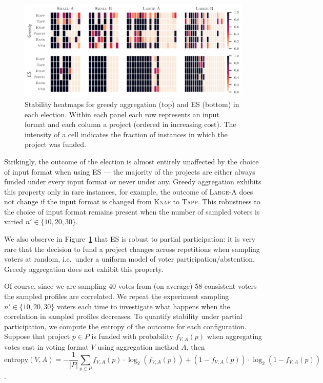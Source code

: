 \documentclass{comsoc2023}
\newcommand{\knap}{\textsc{Knap}}
\newcommand{\tapp}{\textsc{Tapp}}
\newcommand{\mes}{ES}
\begin{document}
\begin{figure}[h]
\begin{center}
\includegraphics[width=14cm]{experiment/heatmaps.png}
\caption{Stability heatmaps for  greedy aggregation (top) and \mes{} (bottom) in each election. 
Within each panel each row represents an   input format and each column a project (ordered in increasing cost).
 The intensity of a cell indicates the fraction of instances in which the project was funded.
}\label{fig:heatmap}
\end{center}\vspace{-3mm}
\end{figure}

Strikingly, the outcome of the election is almost entirely unaffected by the choice of input format when using \mes{} --- the majority of the projects are either always funded under every input format or never under any. Greedy aggregation exhibits this property only in rare instances, for example, the outcome of \textsc{Large-A} does not change if the input format is changed from \knap{} to \tapp.  This robustness to the choice of input format remains present when the number of sampled voters is varied $n'\in\{10,20,30\}.$

We also observe in   Figure~\ref{fig:heatmap} that \mes{} is robust to partial participation: it is very rare that the decision to fund a project changes across repetitions when sampling voters at random, i.e.\ under a uniform model of voter participation/abstention. Greedy aggregation does not exhibit this property. 

Of course, since we are sampling 40 votes from (on average) 58 consistent voters the sampled profiles are correlated. We repeat the experiment sampling $n'\in\{10,20,30\}$ voters each time to investigate what happens when the correlation in sampled profiles decreases.
%
To quantify stability under partial participation, we compute the entropy of the outcome for each configuration. Suppose that project $p\in P$ is funded with probability $f_{V,A}(p)$ when aggregating votes cast in voting format $V$ using aggregation method $A$, then $$\text{entropy}(V,A) = -\frac{1}{|P|}\sum_{p\in P} f_{V,A}(p) \cdot \log_2(f_{V,A}(p)) + (1 - f_{V,A}(p)) \cdot \log_2(1 - f_{V,A}(p))$$.
\end{document}
